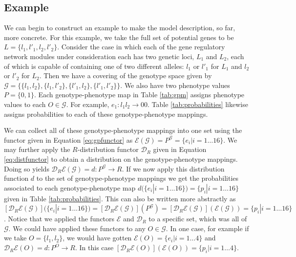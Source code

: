 \subsection*{Example}
We can begin to construct an example to make the model description, so far, more concrete. For this example, we take the full set of potential genes to be $L = \{ l_1,l'_1,l_2,l'_2 \}$. Consider the case in which each of the gene regulatory network modules under consideration each has two genetic loci, $L_1$ and $L_2$, each of which is capable of containing one of two different alleles: $l_1$ or $l'_1$ for $L_1$ and $l_2$ or $l'_2$ for $L_2$. Then we have a covering of the genotype space given by $\mathcal{G} = \{\{l_1,l_2 \},\{l_1,l'_2 \},\{l'_1,l_2\},\{l'_1,l'_2\} \}$. We also have two phenotype values $P = \{0, 1\}$. Each genotype-phenotype map in Table \ref{tab:gpm} assigns phenotype values to each $O \in \mathcal{G}$. For example, $e_1 \colon	l_1 l_2 \rightarrow 00$. Table \ref{tab:probabilities} likewise assigns probabilities to each of these genotype-phenotype mappings.

We can collect all of these genotype-phenotype mappings into one set using the functor given in Equation \ref{eq:gpfunctor} as $\mathcal{E}(\mathcal{G}) = P^{\mathcal{G}} = \{e_i | i=1 \ldots 16 \}$. We may further apply the $R$-distribution functor $\mathcal{D}_R$ given in Equation \ref{eq:distfunctor} to obtain a distribution on the genotype-phenotype mappings. Doing so yields  $\mathcal{D}_R\mathcal{E}(\mathcal{G})=d \colon P^\mathcal{G} \rightarrow R$. If we now apply this distribution function $d$ to the set of genotype-phenotype mappings we get the probabilities associated to each genotype-phenotype map $d(\{e_i | i=1 \ldots 16 \}) = \{p_i|i=1 \ldots 16\}$ given in Table \ref{tab:probabilities}. This can also be written more abstractly as $\left[\mathcal{D}_R\mathcal{E}(\mathcal{G})\right](\{e_i | i=1 \ldots 16 \}) = \left[\mathcal{D}_R\mathcal{E}(\mathcal{G})\right](P^\mathcal{G}) = \left[\mathcal{D}_R\mathcal{E}(\mathcal{G})\right](\mathcal{E}(\mathcal{G})) = \{p_i|i=1 \ldots 16\}$. Notice that we applied the functors $\mathcal{E}$ and $\mathcal{D}_R$ to a specific set, which was all of $\mathcal{G}$. We could have applied these functors to any $O \in \mathcal{G}$. In one case, for example if we take $O = \{l_1, l_2\}$, we would have gotten $\mathcal{E}(O) = \{e_i|i=1 \ldots 4\}$ and $\mathcal{D}_R\mathcal{E}(O) = d \colon P^O \rightarrow R$. In this case $\left[\mathcal{D}_R\mathcal{E}(O)\right](\mathcal{E}(O)) = \{p_i|i=1 \ldots 4\}$.

